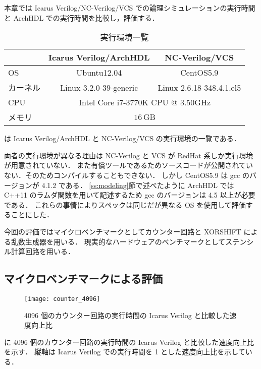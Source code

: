 本章では Icarus Verilog/NC-Verilog/VCS での論理シミュレーションの実行時間と ArchHDL での実行時間を比較し，評価する．

\begin{table}[t]
 \caption{実行環境一覧}
 \label{table:exec_env}
 \begin{center}
  \begin{tabular}{lcc} \toprule
         &  Icarus Verilog/ArchHDL  &  NC-Verilog/VCS   \\ \midrule
  OS     &  Ubuntu12.04             &  CentOS5.9        \\
  カーネル &  Linux 3.2.0-39-generic  &  Linux 2.6.18-348.4.1.el5   \\
  CPU    &  \multicolumn{2}{c}{Intel Core i7-3770K CPU @ 3.50GHz}   \\
  メモリ  &  \multicolumn{2}{c}{$16\,\mathrm{GB}$}  \\ \bottomrule
  \end{tabular}
 \end{center}
\end{table}

 は Icarus Verilog/ArchHDL と NC-Verilog/VCS の実行環境の一覧である．

両者の実行環境が異なる理由は NC-Verilog と VCS が RedHat 系しか実行環境が用意されていない．
また有償ツールであるためソースコードが公開されていない．そのためコンパイルすることもできない．
しかし CentOS5.9 は gcc のバージョンが 4.1.2 である．
\ref{ss:modeling}節で述べたように ArchHDL では C++11 のラムダ関数を用いて記述するため gcc のバージョンは 4.5 以上が必要である．
これらの事情によりスペックは同じだが異なる OS を使用して評価することにした．

今回の評価ではマイクロベンチマークとしてカウンター回路と XORSHIFT による乱数生成器を用いる．
現実的なハードウェアのベンチマークとしてステンシル計算回路を用いる．


\subsection{マイクロベンチマークによる評価}

\begin{figure}[t]
 \centering
 \texttt{[image: counter\_4096]}
 \caption{4096 個のカウンター回路の実行時間の Icarus Verilog と比較した速度向上比}
 \label{fig:counter4096}
\end{figure}

 に 4096 個のカウンター回路の実行時間の Icarus Verilog と比較した速度向上比を示す．
縦軸は Icarus Verilog での実行時間を 1 とした速度向上比を示している．

